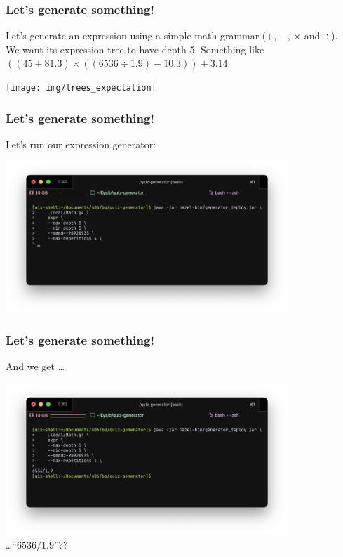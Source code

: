 \documentclass[t,aspectratio=1610]{beamer}
\newcommand{\lp}{\left(}
\newcommand{\rp}{\right)}
\begin{document}
\begin{frame}
\frametitle{Let's generate something!}
Let's generate an expression using a simple math grammar
($ + $, $ - $, $ \times $ and $ \div $).\\
We want its expression tree to have depth 5. \medbreak
Something like
$ \lp \lp 45 + 81.3 \rp \times \lp \lp 6536 \div 1.9 \rp - 10.3 \rp \rp + 3.14 $: \\
\begin{center}
	\texttt{[image: img/trees\_expectation]}
\end{center}
\end{frame}

\begin{frame}
\frametitle{Let's generate something!}
Let's run our expression generator:
\begin{center}
	\includegraphics[width=0.8\textwidth]{img/trees_example_0}	
\end{center}
\end{frame}

\begin{frame}
\frametitle{Let's generate something!}
And we get \dots
\begin{center}
	\includegraphics[width=0.8\textwidth]{img/trees_example_1} \\
	{\dots ``$ 6536 / 1.9 $''??}
\end{center}
\end{frame}
\end{document}
